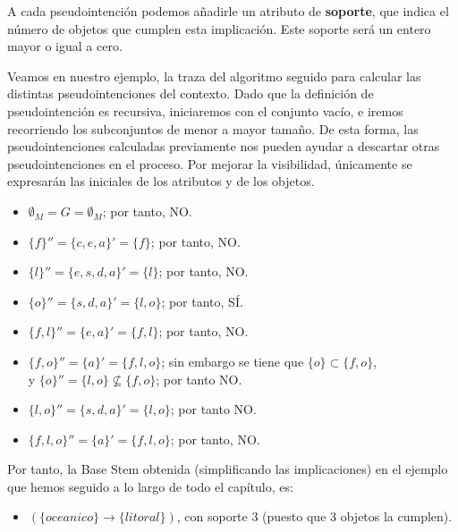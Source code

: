 A cada pseudointención podemos añadirle un atributo de {\bf soporte}, que indica el número de objetos que cumplen esta implicación. Este soporte será un entero mayor o igual a cero.

Veamos en nuestro ejemplo, la traza del algoritmo seguido para calcular las distintas pseudointenciones del contexto. Dado que la definición de pseudointención es recursiva, iniciaremos con el conjunto vacío, e iremos recorriendo los subconjuntos de menor a mayor tamaño. De esta forma, las pseudointenciones calculadas previamente nos pueden ayudar a descartar otras pseudointenciones en el proceso. Por mejorar la visibilidad, únicamente se expresarán las iniciales de los atributos y de los objetos.

\begin{itemize}
	\item $\emptyset_M = G = \emptyset_M$; por tanto, NO.
	\item $\{f\}'' = \{c,e,a\}' = \{f\}$; por tanto, NO.
	\item $\{l\}'' = \{e,s,d,a\}' = \{l\}$; por tanto, NO.
	\item $\{o\}'' = \{s,d,a\}' = \{l,o\}$; por tanto, SÍ.
	\item $\{f,l\}'' = \{e,a\}' = \{f,l\}$; por tanto, NO.
	\item $\{f,o\}'' = \{a\}' = \{f,l,o\}$; sin embargo se tiene que $\{o\}\subset\{f,o\}$, \\ y $\{o\}'' = \{l,o\} \not\subseteq \{f,o\}$; por tanto NO.
	\item $\{l,o\}'' = \{s,d,a\}' = \{l,o\}$; por tanto NO.
	\item $\{f,l,o\}'' = \{a\}' = \{f,l,o\}$; por tanto, NO.
\end{itemize}

Por tanto, la Base Stem obtenida (simplificando las implicaciones) en el ejemplo que hemos seguido a lo largo de todo el capítulo, es:
\begin{itemize}
	\item $(\{oceanico\} \rightarrow {\{litoral\}})$, con soporte 3 (puesto que 3 objetos la cumplen).
\end{itemize}


